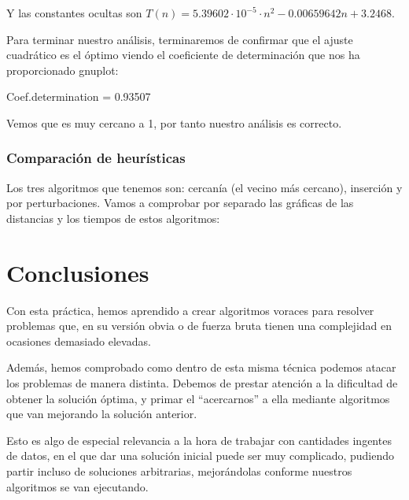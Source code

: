 \documentclass[10pt,a4paper]{article}
\begin{document}
 \newpage
 
 Y las constantes ocultas son \(T(n) = 5.39602 \cdot 10^{-5} \cdot n^2 - 0.00659642 n + 3.2468\).
 
 Para terminar nuestro análisis, terminaremos de confirmar que el ajuste cuadrático es el óptimo viendo el coeficiente de determinación que nos ha proporcionado gnuplot:
 
 Coef.determination = 0.93507
 
 Vemos que es muy cercano a 1, por tanto nuestro análisis es correcto.

\subsubsection{Comparación de heurísticas}

Los tres algoritmos que tenemos son: cercanía (el vecino más cercano), inserción y por perturbaciones. Vamos a comprobar por separado las gráficas de las distancias y los tiempos de estos algoritmos:

\section{Conclusiones}

Con esta práctica, hemos aprendido a crear algoritmos voraces para resolver problemas que, en su versión obvia o de fuerza bruta tienen una complejidad en ocasiones demasiado elevadas.

Además, hemos comprobado como dentro de esta misma técnica podemos atacar los problemas de manera distinta. Debemos de prestar atención a la dificultad de obtener la solución óptima, y primar el ``acercarnos'' a ella mediante algoritmos que van mejorando la solución anterior.

Esto es algo de especial relevancia a la hora de trabajar con cantidades ingentes de datos, en el que dar una solución inicial puede ser muy complicado, pudiendo partir incluso de soluciones arbitrarias, mejorándolas conforme nuestros algoritmos se van ejecutando. 
\end{document}
